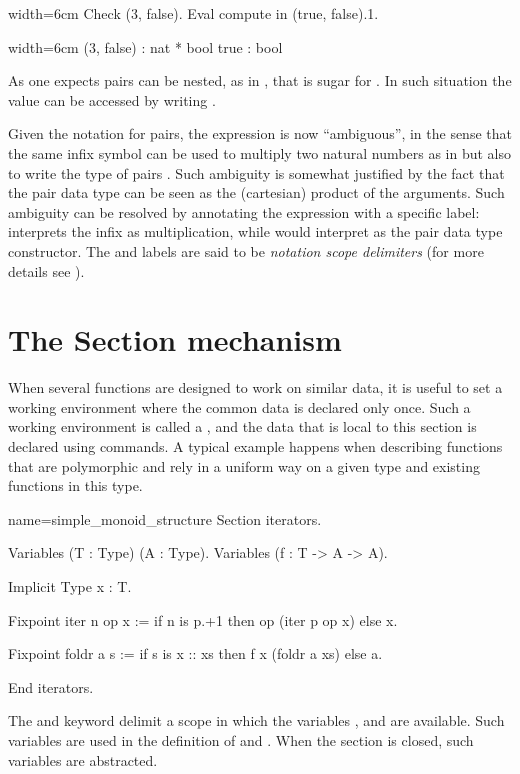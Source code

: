 \begin{coq}{}{width=6cm}
Check (3, false).
Eval compute in (true, false).1.
\end{coq}
\begin{coqout}{}{width=6cm}
(3, false) : nat * bool
true : bool
\end{coqout}
As one expects pairs can be nested, as in , that is sugar
for .  In such situation the value  can be
accessed by writing .

Given the notation for pairs, the expression  is now ``ambiguous'',
in the sense that the same infix \C{*} symbol can be used to multiply two
natural numbers as in  but also to write the type of pairs .  Such ambiguity is somewhat justified by the fact that the pair
data type can be seen as the (cartesian) product of the arguments.  Such
ambiguity can be resolved by annotating the expression with a specific
label:  interprets the infix \C{*} as multiplication,
while  would interpret \C{*} as the pair data type
constructor. The  and  labels are said to be
\emph{notation scope delimiters} (for more details see
\cite[section 12.2]{Coq:manual}).

\section{The Section mechanism}
When several functions are designed to work on similar data, it is
useful to set a working environment where the common data is declared
only once.  Such a working environment is called a , and
the data that is local to this section is declared using 
commands.  A typical example happens when describing functions that
are polymorphic and rely in a uniform way on a given type and existing
functions in this type.

\begin{coq}{name=simple_monoid_structure}{}
Section iterators.

Variables (T : Type) (A : Type).
Variables (f : T -> A -> A).

Implicit Type x : T.

Fixpoint iter n op x :=
  if n is p.+1 then op (iter p op x) else x.

Fixpoint foldr a s :=
  if s is x :: xs then f x (foldr a xs) else a.

End iterators.
\end{coq}
The  and  keyword delimit a scope in which
the variables ,  and  are available.  Such variables
are used in the definition of  and .  When the section is
closed, such variables are abstracted.

